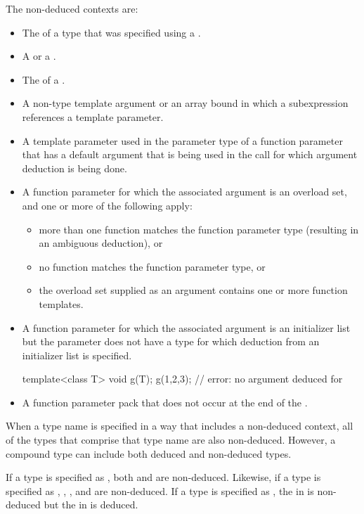 \pnum
The non-deduced contexts are:

%
\begin{itemize}
\item
The
of a type that was specified using a
.
\item
A  or a .
\item
The  of a .
\item
A non-type template argument or an array bound in which a subexpression
references a template parameter.
\item
A template parameter used in the parameter type of a function parameter that
has a default argument that is being used in the call for which argument
deduction is being done.
\item
A function parameter for which the associated argument is an
overload set, and one or more of the following apply:
\begin{itemize}
\item
more than one function matches the function parameter type (resulting in
an ambiguous deduction), or
\item
no function matches the function parameter type, or
\item
the overload set supplied as an argument contains one or more function templates.
\end{itemize}
\item A function parameter for which the associated argument is an initializer
list but the parameter does not have
a type for which deduction from an initializer list is specified.
\begin{example}
\begin{codeblock}
template<class T> void g(T);
g({1,2,3});                 // error: no argument deduced for 
\end{codeblock}
\end{example}
\item A function parameter pack that does not occur at the end of the
.
\end{itemize}

\pnum
When a type name is specified in a way that includes a non-deduced
context, all of the types that comprise that type name are also
non-deduced.
However, a compound type can include both deduced and non-deduced types.
\begin{example}
If a type is specified as
,
both
and
are non-deduced.
Likewise, if a type is specified as
,
,
,
and
are non-deduced.
If a type is specified as
,
the
in
is non-deduced but
the
in
is deduced.
\end{example}

